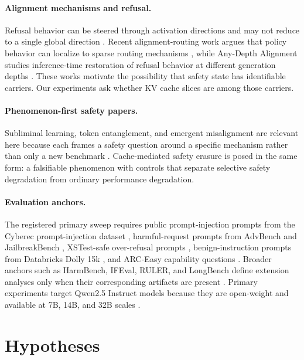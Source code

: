 \documentclass[11pt]{article}
\begin{document}
\paragraph{Alignment mechanisms and refusal.}
Refusal behavior can be steered through activation directions and may not reduce to a single global direction \citep{arditi2024refusal,joad2026more_refusal}. Recent alignment-routing work argues that policy behavior can localize to sparse routing mechanisms \citep{frank2026alignmentroutes}, while Any-Depth Alignment studies inference-time restoration of refusal behavior at different generation depths \citep{zhang2026anydepth}. These works motivate the possibility that safety state has identifiable carriers. Our experiments ask whether KV cache slices are among those carriers.

\paragraph{Phenomenon-first safety papers.}
Subliminal learning, token entanglement, and emergent misalignment are relevant here because each frames a safety question around a specific mechanism rather than only a new benchmark \citep{cloud2025subliminal,zur2025token,betley2025emergent}. Cache-mediated safety erasure is posed in the same form: a falsifiable phenomenon with controls that separate selective safety degradation from ordinary performance degradation.

\paragraph{Evaluation anchors.}
The registered primary sweep requires public prompt-injection prompts from the Cyberec prompt-injection dataset \citep{cyberec2026promptinjection}, harmful-request prompts from AdvBench and JailbreakBench \citep{zou2023universal,chao2024jailbreakbench}, XSTest-safe over-refusal prompts \citep{rottger2023xstest}, benign-instruction prompts from Databricks Dolly 15k \citep{databricks2023dolly}, and ARC-Easy capability questions \citep{clark2018arc}. Broader anchors such as HarmBench, IFEval, RULER, and LongBench define extension analyses only when their corresponding artifacts are present \citep{mazeika2024harmbench,zhou2023ifeval,hsieh2024ruler,bai2024longbench}. Primary experiments target Qwen2.5 Instruct models because they are open-weight and available at 7B, 14B, and 32B scales \citep{qwen2024qwen25}.

\section{Hypotheses}
\end{document}
